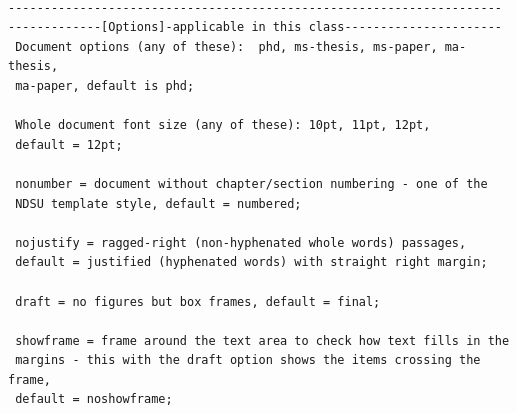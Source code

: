 \documentclass[phd,showgrids]{ndsu-thesis-2022}
\begin{document}
\begin{lstlisting}[basicstyle=\ttfamily\footnotesize\color{blue}] %or \small or \footnotesize etc.

---------------------------------------------------------------------
-------------[Options]-applicable in this class----------------------
 Document options (any of these):  phd, ms-thesis, ms-paper, ma-thesis, 
 ma-paper, default is phd; 
 
 Whole document font size (any of these): 10pt, 11pt, 12pt, 
 default = 12pt; 
 
 nonumber = document without chapter/section numbering - one of the 
 NDSU template style, default = numbered; 
 
 nojustify = ragged-right (non-hyphenated whole words) passages, 
 default = justified (hyphenated words) with straight right margin; 
 
 draft = no figures but box frames, default = final; 
 
 showframe = frame around the text area to check how text fills in the 
 margins - this with the draft option shows the items crossing the frame, 
 default = noshowframe; 
 

\end{lstlisting}
\end{document}
